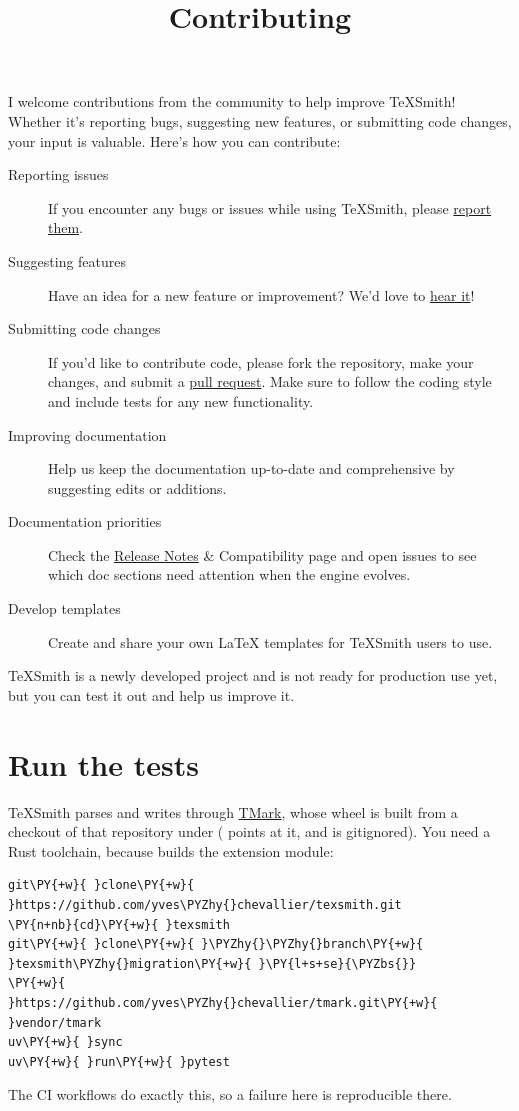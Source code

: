 \documentclass[a4paper,twoside]{article}
\title{Contributing}
\author{}\date{}
\begin{document}
\maketitle
I welcome contributions from the community to help improve TeXSmith! Whether it's reporting bugs, suggesting new features, or submitting code changes, your input is valuable. Here's how you can contribute:
\begin{description}
\item[{Reporting issues}] If you encounter any bugs or issues while using TeXSmith, please \href{https://github.com/yves-chevallier/texsmith/issues}{report them}.
\item[{Suggesting features}] Have an idea for a new feature or improvement? We'd love to \href{https://github.com/yves-chevallier/texsmith/issues}{hear it}!
\item[{Submitting code changes}] If you'd like to contribute code, please fork the repository, make your changes, and submit a \href{https://github.com/yves-chevallier/texsmith/pulls}{pull request}. Make sure to follow the coding style and include tests for any new functionality.
\item[{Improving documentation}] Help us keep the documentation up-to-date and comprehensive by suggesting edits or additions.
\item[{Documentation priorities}] Check the \hyperref[releasenotes]{Release Notes} \& Compatibility page and open issues to see which doc sections need attention when the engine evolves.
\item[{Develop templates}] Create and share your own \LaTeX{} templates for TeXSmith users to use.
\end{description}
TeXSmith is a newly developed project and is not ready for production use yet, but you can test it out and help us improve it.
\section{Run the tests}
TeXSmith parses and writes through \href{https://github.com/yves-chevallier/tmark}{TMark},
whose wheel is built from a checkout of that repository under 
( points at it, and  is gitignored). You need a
Rust toolchain, because  builds the extension module:
\begin{tscode}[lang=bash, engine=pygments]
\begin{Verbatim}[commandchars=\\\{\},breaklines, breakanywhere, commandchars=\\\{\}]
git\PY{+w}{ }clone\PY{+w}{ }https://github.com/yves\PYZhy{}chevallier/texsmith.git
\PY{n+nb}{cd}\PY{+w}{ }texsmith
git\PY{+w}{ }clone\PY{+w}{ }\PYZhy{}\PYZhy{}branch\PY{+w}{ }texsmith\PYZhy{}migration\PY{+w}{ }\PY{l+s+se}{\PYZbs{}}
\PY{+w}{    }https://github.com/yves\PYZhy{}chevallier/tmark.git\PY{+w}{ }vendor/tmark
uv\PY{+w}{ }sync
uv\PY{+w}{ }run\PY{+w}{ }pytest
\end{Verbatim}
\end{tscode}
The CI workflows do exactly this, so a failure here is reproducible there.
\end{document}
